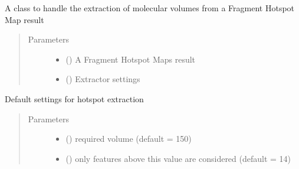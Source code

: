 \documentclass[letterpaper,10pt,english]{sphinxmanual}
\begin{document}
\begin{fulllineitems}
\label{\detokenize{result_api:hotspots.result.Extractor}}
A class to handle the extraction of molecular volumes from a Fragment Hotspot Map result
\begin{quote}\begin{description}
\item[{Parameters}] \leavevmode\begin{itemize}
\item {} 
 () \textendash{} A Fragment Hotspot Maps result

\item {} 
 () \textendash{} Extractor settings

\end{itemize}

\end{description}\end{quote}

\begin{fulllineitems}
\label{\detokenize{result_api:hotspots.result.Extractor.Settings}}
Default settings for hotspot extraction
\begin{quote}\begin{description}
\item[{Parameters}] \leavevmode\begin{itemize}
\item {} 
 () \textendash{} required volume (default = 150)

\item {} 
 () \textendash{} only features above this value are considered (default = 14)


\end{itemize}
\end{description}
\end{quote}
\end{fulllineitems}
\end{fulllineitems}
\end{document}
